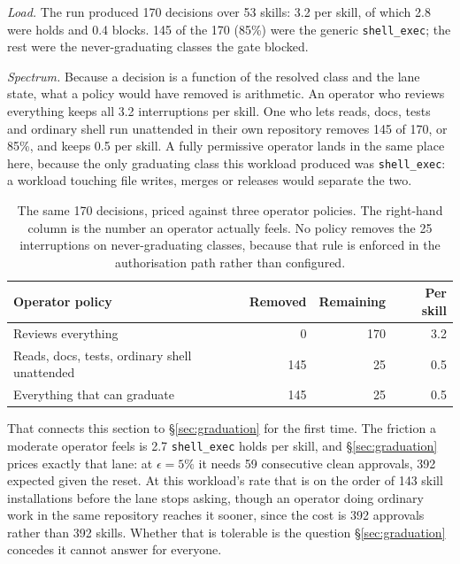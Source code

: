 \documentclass[10pt]{article}
\begin{document}
\emph{Load.} The run produced 170 decisions over 53 skills: 3.2 per skill, of which
2.8 were holds and 0.4 blocks. 145 of the 170 (85\%) were the generic
\texttt{shell\_exec}; the rest were the never-graduating classes the gate blocked.

\emph{Spectrum.} Because a decision is a function of the resolved class and the lane
state, what a policy would have removed is arithmetic. An operator who reviews
everything keeps all 3.2 interruptions per skill. One who lets reads, docs, tests and
ordinary shell run unattended in their own repository removes 145 of 170, or 85\%,
and keeps 0.5 per skill. A fully permissive operator lands in the same place here,
because the only graduating class this workload produced was \texttt{shell\_exec}: a
workload touching file writes, merges or releases would separate the two.

\begin{table}[H]
\centering
\begin{tabular}{lrrr}
\toprule
Operator policy & Removed & Remaining & Per skill \\
\midrule
Reviews everything & 0 & 170 & 3.2 \\
Reads, docs, tests, ordinary shell unattended & 145 & 25 & 0.5 \\
Everything that can graduate & 145 & 25 & 0.5 \\
\bottomrule
\end{tabular}
\caption{The same 170 decisions, priced against three operator policies. The
right-hand column is the number an operator actually feels. No policy removes the 25
interruptions on never-graduating classes, because that rule is enforced in the
authorisation path rather than configured.}
\end{table}

That connects this section to \S\ref{sec:graduation} for the first time. The friction
a moderate operator feels is 2.7 \texttt{shell\_exec} holds per skill, and
\S\ref{sec:graduation} prices exactly that lane: at $\epsilon = 5\%$ it needs 59
consecutive clean approvals, 392 expected given the reset. At this workload's rate
that is on the order of 143 skill installations before the lane stops asking, though
an operator doing ordinary work in the same repository reaches it sooner, since the
cost is 392 approvals rather than 392 skills. Whether that is tolerable is the
question \S\ref{sec:graduation} concedes it cannot answer for everyone.
\end{document}
